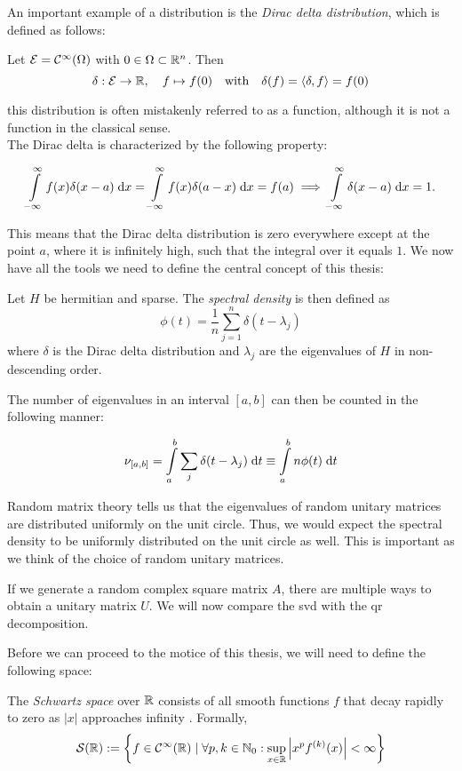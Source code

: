 An important example of a distribution is the \emph{Dirac delta distribution}, which is defined as follows:

\begin{definition}
    Let $\mathcal{E} = \mathcal{C}^{\infty}(\Omega)$ with $0 \in \Omega \subset \mathbb{R}^n$.
    Then
    $$\delta: \mathcal{E} \to \mathbb{R}, \quad f \mapsto f(0) \quad \text{with} \quad \delta(f) = \langle \delta, f \rangle = f(0)$$
\end{definition}

this distribution is often mistakenly referred to as a function,
although it is not a function in the classical sense.\\
The Dirac delta is characterized by the following property:

\[
\int\limits_{-\infty}^{\infty} f(x) \delta(x-a) \;\mathrm{d}x = \int\limits_{-\infty}^{\infty} f(x) \delta(a-x) \;\mathrm{d}x = f(a) \implies \int\limits_{-\infty}^{\infty} \delta(x-a) \;\mathrm{d}x = 1.
\]

This means that the Dirac delta distribution is zero everywhere except at the point $a$,
where it is infinitely high, such that the integral over it equals $1$.
We now have all the tools we need to define the central concept of this thesis:

\begin{definition}
    Let $H$ be hermitian and sparse.
    The \emph{spectral density} is then defined as
    \[
    \phi(t) = \frac{1}{n} \sum_{j=1}^{n} \delta(t - \lambda_j)
    \]
    where $\delta$ is the Dirac delta distribution
    and $\lambda_j$ are the eigenvalues of $H$ in non-descending order.
\end{definition}

The number of eigenvalues in an interval $[a, b]$ can then be counted in the following manner:

\begin{equation} \label{eq:nu_a_b}
    \nu_{[a, b]} = \int\limits_a^b \sum_j \delta(t - \lambda_j) \;\mathrm{d}t \equiv \int\limits_a^b n \phi(t) \;\mathrm{d}t
\end{equation}

Random matrix theory tells us that the eigenvalues of random unitary matrices are distributed uniformly on the unit circle.
Thus, we would expect the spectral density to be uniformly distributed on the unit circle as well.
This is important as we think of the choice of random unitary matrices.

If we generate a random complex square matrix $A$,
there are multiple ways to obtain a unitary matrix $U$.
We will now compare the svd with the qr decomposition.

Before we can proceed to the motice of this thesis, we will need to define the following space:

\begin{definition} \label{def:Schwartz space}
    The \emph{Schwartz space} over $\mathbb{R}$ consists of all smooth functions $f$ that decay rapidly to zero as $|x|$ approaches infinity \cite{richtmyer}.
    Formally,
    \[
    \mathcal{S}(\mathbb{R}) := \left\{f \in \mathcal{C}^{\infty}(\mathbb{R}) \mid \forall p, k \in \mathbb{N}_0: \sup_{x \in \mathbb{R}} \left| x^p f^{(k)}(x) \right| < \infty \right\}
    \]
\end{definition}